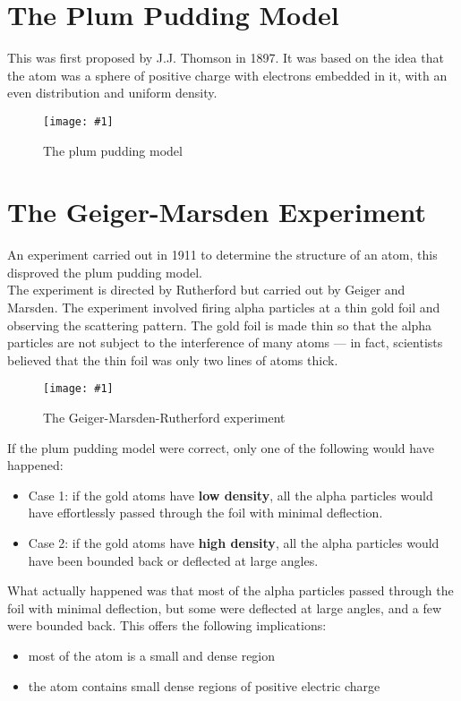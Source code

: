 \documentclass[a4paper,12pt]{article}
\let\oldsection\section
\renewcommand\section{\clearpage\oldsection}
\newcommand{\lb}{\\[8pt]}
\newcommand{\img}[4]{\begin{center}
  \begin{figure}[H]
    \centering
    \texttt{[image: \#1]}
    \caption{#3}
    \label{fig:#4}
  \end{figure}
\end{center}}
\begin{document}
\pagebreak

\section{The Plum Pudding Model}
This was first proposed by J.J. Thomson in 1897. It was based on the idea that the atom was a sphere of positive charge with electrons embedded in it, with an even distribution and uniform density.

\img{plumpudding.png}{0.4}{The plum pudding model}{plumpudding}

\section{The Geiger-Marsden Experiment}
An experiment carried out in 1911 to determine the structure of an atom, this disproved the plum pudding model.\lb
The experiment is directed by Rutherford but carried out by Geiger and Marsden. The experiment involved firing alpha particles at a thin gold foil and observing the scattering pattern. The gold foil is made thin so that the alpha particles are not subject to the interference of many atoms --- in fact, scientists believed that the thin foil was only two lines of atoms thick.

\img{goldfoilexpt.png}{0.7}{The Geiger-Marsden-Rutherford experiment}{goldfoil}

If the plum pudding model were correct, only one of the following would have happened:
\begin{itemize}
  \item Case 1: if the gold atoms have \textbf{low density}, all the alpha particles would have effortlessly passed through the foil with minimal deflection.
  \item Case 2: if the gold atoms have \textbf{high density}, all the alpha particles would have been bounded back or deflected at large angles.
\end{itemize}

\pagebreak

What actually happened was that most of the alpha particles passed through the foil with minimal deflection, but some were deflected at large angles, and a few were bounded back. This offers the following implications:
\begin{itemize}
  \item most of the atom is a small and dense region
  \item the atom contains small dense regions of positive electric charge
\end{itemize}
\end{document}
